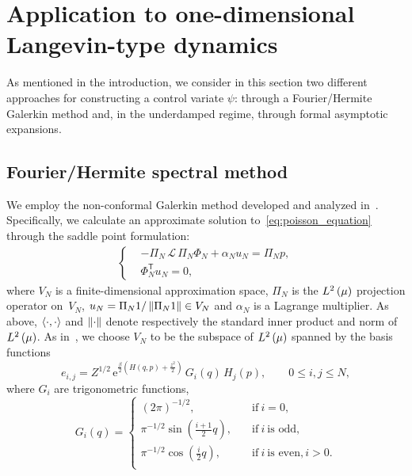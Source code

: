 \documentclass[11pt,a4paper]{article}
\newcommand{\e}{\mathrm{e}}
\renewcommand{\t}{\mathsf T}
\theoremstyle{plain}
\numberwithin{equation}{section}
\renewcommand{\leq}{\leqslant}
\begin{document}
\section{Application to one-dimensional Langevin-type dynamics}%
\label{sec:application_to_one_dimensional_langevin_type_dynamics}

As mentioned in the introduction,
we consider in this section two different approaches for constructing a control variate $\psi$:
through a Fourier/Hermite Galerkin method and,
in the underdamped regime,
through formal asymptotic expansions.

\subsection{Fourier/Hermite spectral method}%
\label{sub:galerkin_approach}
We employ the non-conformal Galerkin method developed and analyzed in~\cite{roussel2018spectral}.
Specifically, we calculate an approximate solution to~\eqref{eq:poisson_equation} through the saddle point formulation:
\begin{align}
  \label{eq:saddle_point_formutation}
  \left\{
    \begin{aligned}
       & - \Pi_N \, \mathcal L \, \Pi_N \Phi_N + \alpha_N u_N = \Pi_N p, \\
       & \Phi_N^\t u_N = 0,
    \end{aligned}
  \right.
\end{align}
where $V_N$ is a finite-dimensional approximation space,
$\Pi_N$ is the $\lp{2}{\mu}$ projection operator on~$V_N$,
$u_N = \Pi_N 1 / \norm{\Pi_N 1} \in V_N$
and $\alpha_N$ is a Lagrange multiplier.
As above,
$\ip{\cdot}{\cdot}$ and $\norm{\cdot}$ denote respectively the standard inner product and norm of $\lp{2}{\mu}$.
As in~\cite{roussel2018spectral},
we choose $V_N$ to be the subspace of $\lp{2}{\mu}$ spanned by the basis functions
\begin{equation*}
  \label{eq:basis_functions}
  e_{i,j} = Z^{1/2} \, \e^{\frac{\beta}{2} \left( H(q,p) + \frac{z^2}{2} \right)}
  \, G_i(q) \, H_j(p), \qquad 0 \leq i,j \leq N,
\end{equation*}
where $G_i$ are trigonometric functions,
\begin{equation}
  \label{eq:definition_trigonometric_functions}
  G_i(q) =
  \left\{ \begin{aligned}
    (2 \pi)^{-1/2}, \quad & \text{if}~i = 0, \\
    \pi^{-1/2} \sin\left(\frac{i + 1}{2}q\right), \quad & \text{if}~i~\text{is odd}, \\
    \pi^{-1/2} \cos\left(\frac{i}{2}q\right), \quad & \text{if}~i~\text{is even}, i > 0. \\
  \end{aligned} \right.
\end{equation}
\end{document}
